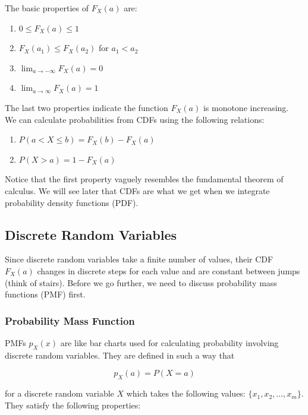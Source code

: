 \documentclass[12pt, a4paper]{article}
\begin{document}
The basic properties of $F_X(a)$ are:

\begin{enumerate}[i]
  \item $0 \le F_X(a) \le 1$
  \item $F_X(a_1) \le F_X(a_2)$ for $a_1 < a_2$
  \item $\displaystyle \lim_{a\to-\infty} F_X(a)=0$
  \item $\displaystyle \lim_{a\to\infty} F_X(a)=1$
\end{enumerate}

The last two properties indicate the function $F_X(a)$ is monotone increasing. \\

We can calculate probabilities from CDFs using the following relations:

\begin{enumerate}[i]
  \item $P(a<X\le b)=F_X(b)-F_X(a)$
  \item $P(X>a)=1-F_X(a)$
\end{enumerate}

Notice that the first property vaguely resembles the fundamental theorem of calculus. We will see later that CDFs are what we get when we integrate probability density functions (PDF). \\

\subsection{Discrete Random Variables}

Since discrete random variables take a finite number of values, their CDF $F_X(a)$ changes in discrete steps for each value and are constant between jumps (think of stairs). Before we go further, we need to discuss probability mass functions (PMF) first.

\subsubsection{Probability Mass Function}

PMFs $p_X(x)$ are like bar charts used for calculating probability involving discrete random variables. They are defined in such a way that

$$p_X(a)=P(X=a)$$

for a discrete random variable $X$ which takes the following values: $\{x_1, x_2, \dots, x_m\}$. They satisfy the following properties:
\end{document}
